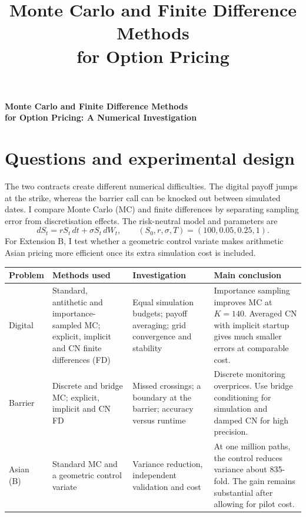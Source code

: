 \documentclass[12pt]{article}
\title{Monte Carlo and Finite Difference Methods\\for Option Pricing}
\date{}
\theoremstyle{definition}
\begin{document}
\begin{center}
{\Large\bfseries Monte Carlo and Finite Difference Methods\\[3pt]
for Option Pricing: A Numerical Investigation}
\end{center}


\section{Questions and experimental design}
The two contracts create different numerical difficulties. The digital payoff jumps at
the strike, whereas the barrier call can be knocked out between simulated dates.
I compare Monte Carlo (MC) and finite differences by separating sampling error
from discretisation effects.
The risk-neutral model and parameters are
\[
dS_t=rS_t\,dt+\sigma S_t\,dW_t,\qquad
(S_0,r,\sigma,T)=(100,0.05,0.25,1).
\]
For Extension B, I test whether a geometric control variate makes arithmetic Asian
pricing more efficient once its extra simulation cost is included.

\begin{center}
\setlength{\tabcolsep}{4pt}
\begin{tabular}{|>{\raggedright\arraybackslash}p{1.9cm}|>{\raggedright\arraybackslash}p{3.5cm}|>{\raggedright\arraybackslash}p{3.7cm}|>{\raggedright\arraybackslash}p{5.3cm}|}
\hline
\textbf{Problem}&\textbf{Methods used}&\textbf{Investigation}&\textbf{Main conclusion}\\\hline
Digital&Standard, antithetic and importance-sampled MC; explicit, implicit and CN finite differences (FD)&Equal simulation budgets; payoff averaging; grid convergence and stability&Importance sampling improves MC at $K=140$. Averaged CN with implicit startup gives much smaller errors at comparable cost.\\\hline
Barrier&Discrete and bridge MC; explicit, implicit and CN FD&Missed crossings; a boundary at the barrier; accuracy versus runtime&Discrete monitoring overprices. Use bridge conditioning for simulation and damped CN for high precision.\\\hline
Asian (B)&Standard MC and a geometric control variate&Variance reduction, independent validation and cost&At one million paths, the control reduces variance about 835-fold. The gain remains substantial after allowing for pilot cost.\\\hline
\end{tabular}
\end{center}
\end{document}
